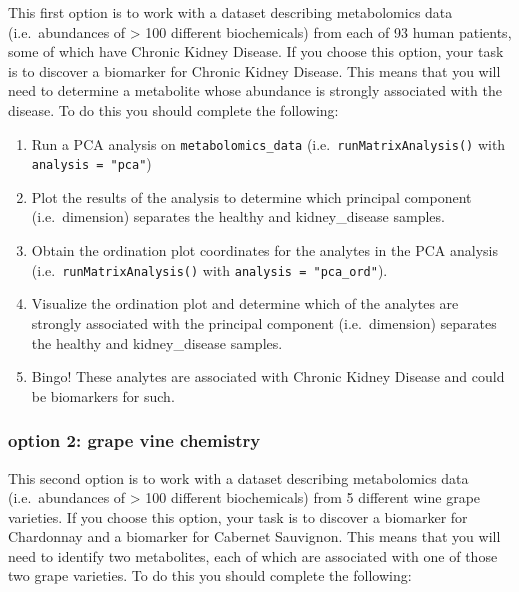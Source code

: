 \documentclass[
]{krantz}
\providecommand{\tightlist}{%
  \setlength{\itemsep}{0pt}\setlength{\parskip}{0pt}}
\begin{document}
This first option is to work with a dataset describing metabolomics data (i.e.~abundances of \textgreater{} 100 different biochemicals) from each of 93 human patients, some of which have Chronic Kidney Disease. If you choose this option, your task is to discover a biomarker for Chronic Kidney Disease. This means that you will need to determine a metabolite whose abundance is strongly associated with the disease. To do this you should complete the following:

\begin{enumerate}
\def\labelenumi{\arabic{enumi}.}
\tightlist
\item
  Run a PCA analysis on \texttt{metabolomics\_data} (i.e.~\texttt{runMatrixAnalysis()} with \texttt{analysis\ =\ "pca"})
\item
  Plot the results of the analysis to determine which principal component (i.e.~dimension) separates the healthy and kidney\_disease samples.
\item
  Obtain the ordination plot coordinates for the analytes in the PCA analysis (i.e.~\texttt{runMatrixAnalysis()} with \texttt{analysis\ =\ "pca\_ord"}).
\item
  Visualize the ordination plot and determine which of the analytes are strongly associated with the principal component (i.e.~dimension) separates the healthy and kidney\_disease samples.
\item
  Bingo! These analytes are associated with Chronic Kidney Disease and could be biomarkers for such.
\end{enumerate}

\hypertarget{option-2-grape-vine-chemistry}{%
\subsubsection{option 2: grape vine chemistry}\label{option-2-grape-vine-chemistry}}

This second option is to work with a dataset describing metabolomics data (i.e.~abundances of \textgreater{} 100 different biochemicals) from 5 different wine grape varieties. If you choose this option, your task is to discover a biomarker for Chardonnay and a biomarker for Cabernet Sauvignon. This means that you will need to identify two metabolites, each of which are associated with one of those two grape varieties. To do this you should complete the following:
\end{document}
